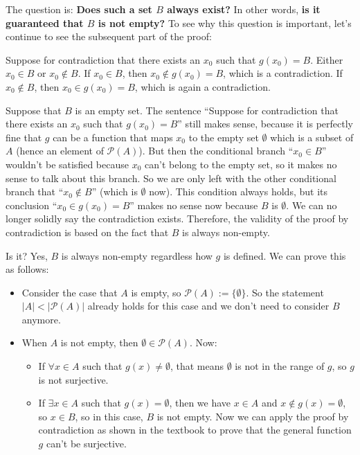 \documentclass[12pt, letterpaper, oneside]{book}
\begin{document}
The question is: \textbf{Does such a set $B$ always exist?} In other words,
\textbf{is it guaranteed that $B$ is not empty?} To see why this question is
important, let's continue to see the subsequent part of the proof:

\begin{displayquote}
  Suppose for contradiction that there exists an $x_0$ such that $g(x_0) = B$.
  Either $x_0 \in B$ or $x_0 \notin B$. If $x_0 \in B$, then $x_0 \notin g(x_0)
    = B$, which is a contradiction. If $x_0 \notin B$, then $x_0 \in g(x_0) = B$,
  which is again a contradiction.
\end{displayquote}

Suppose that $B$ is an empty set. The sentence ``Suppose for contradiction that
there exists an $x_0$ such that $g(x_0) = B$'' still makes sense, because it is
perfectly fine that $g$ can be a function that maps $x_0$ to the empty set
$\emptyset$ which is a subset of $A$ (hence an element of $\mathcal{P}(A)$).
But then the conditional branch ``$x_0 \in B$'' wouldn't be satisfied because
$x_0$ can't belong to the empty set, so it makes no sense to talk about this
branch. So we are only left with the other conditional branch that ``$x_0 \notin
  B$'' (which is $\emptyset$ now). This condition always holds, but its conclusion
``$x_0 \in g(x_0) = B$'' makes no sense now because $B$ is $\emptyset$. We can
no longer solidly say the contradiction exists. Therefore, the validity of the
proof by contradiction is based on the fact that $B$ is always non-empty.

Is it? Yes, $B$ is always non-empty regardless how $g$ is defined. We can prove
this as follows:

\begin{itemize}
  \item Consider the case that $A$ is empty, so $\mathcal{P}(A):=
          \{\emptyset\}$. So the statement $|A| < |\mathcal{P}(A)|$ already holds for
        this case and we don't need to consider $B$ anymore.
  \item When $A$ is not empty, then $\emptyset \in \mathcal{P}(A)$. Now:
        \begin{itemize}
          \item If $\forall x \in A$ such that $g(x) \neq \emptyset$, that means
                $\emptyset$ is not in the range of $g$, so $g$ is not surjective.
          \item If $\exists x \in A$ such that $g(x) = \emptyset$, then we have
                $x \in A$ and $x \notin g(x) = \emptyset$, so $x \in B$, so in this case,
                $B$ is not empty. Now we can apply the proof by contradiction as shown in
                the textbook to prove that the general function $g$ can't be surjective.
        \end{itemize}
\end{itemize}
\end{document}
